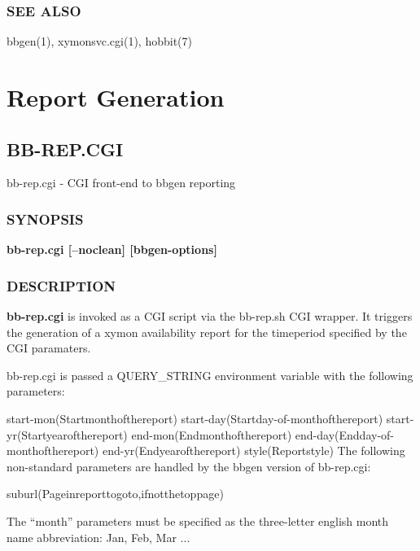 \subsection{SEE ALSO}
bbgen(1), xymonsvc.cgi(1), hobbit(7) 

%
\chapter{Report Generation}
%
\newpage
\section{BB-REP.CGI}

 bb-rep.cgi - CGI front-end to bbgen reporting
 \subsection{SYNOPSIS}
\textbf{bb-rep.cgi [--noclean] [bbgen-options]}


 
\subsection{DESCRIPTION}
\textbf{bb-rep.cgi}
 is invoked as a CGI script via the bb-rep.sh CGI wrapper. It triggers the generation of a xymon availability report for the timeperiod specified by the CGI paramaters. 

  bb-rep.cgi is passed a QUERY\_STRING environment variable with the following parameters: 


  
start-mon(Startmonthofthereport)  
start-day(Startday-of-monthofthereport)  
start-yr(Startyearofthereport)  
end-mon(Endmonthofthereport)  
end-day(Endday-of-monthofthereport)  
end-yr(Endyearofthereport)  
style(Reportstyle)  
 The following non-standard parameters are handled by the bbgen version of bb-rep.cgi: 


  
suburl(Pageinreporttogoto,ifnotthetoppage) 


  The ``month'' parameters must be specified as the three-letter english month name abbreviation: Jan, Feb, Mar ... 


